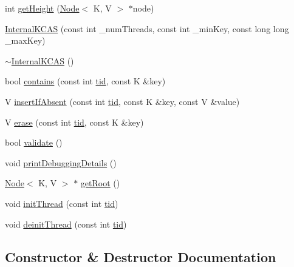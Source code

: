 \begin{DoxyCompactItemize}
\item 
int \hyperlink{classInternalKCAS_ad72d4be132cc659a5c992321277cf193}{get\+Height} (\hyperlink{classNode}{Node}$<$ K, V $>$ $\ast$node)
\item 
\hyperlink{classInternalKCAS_ac9c322cd3a85b979a08de155c21f67e1}{Internal\+K\+C\+AS} (const int \+\_\+num\+Threads, const int \+\_\+min\+Key, const long long \+\_\+max\+Key)
\item 
\hyperlink{classInternalKCAS_abd61df2bf061536a6565252d31d3f3f3}{$\sim$\+Internal\+K\+C\+AS} ()
\item 
bool \hyperlink{classInternalKCAS_a6cc67a7c0c48dcb3dfc92caf1661caff}{contains} (const int \hyperlink{microbench_2main_8cpp_a9ca9869868fe7e7a38a921cc7de4103f}{tid}, const K \&key)
\item 
V \hyperlink{classInternalKCAS_ab3010217722850563fca996779d44aaf}{insert\+If\+Absent} (const int \hyperlink{microbench_2main_8cpp_a9ca9869868fe7e7a38a921cc7de4103f}{tid}, const K \&key, const V \&value)
\item 
V \hyperlink{classInternalKCAS_a13be8756f4bed1d759d5018aa0d2d380}{erase} (const int \hyperlink{microbench_2main_8cpp_a9ca9869868fe7e7a38a921cc7de4103f}{tid}, const K \&key)
\item 
bool \hyperlink{classInternalKCAS_abbe352f377d39453950e11caf7c5081d}{validate} ()
\item 
void \hyperlink{classInternalKCAS_a03139bf48fad9708cf170f246696870a}{print\+Debugging\+Details} ()
\item 
\hyperlink{classNode}{Node}$<$ K, V $>$ $\ast$ \hyperlink{classInternalKCAS_a4b6e760af14cd473618fcc12baf18d6d}{get\+Root} ()
\item 
void \hyperlink{classInternalKCAS_ab4fe3ffb3c0839a75a9a4272750d10e4}{init\+Thread} (const int \hyperlink{microbench_2main_8cpp_a9ca9869868fe7e7a38a921cc7de4103f}{tid})
\item 
void \hyperlink{classInternalKCAS_a34b83ecf38951b339abc5e1270d97c84}{deinit\+Thread} (const int \hyperlink{microbench_2main_8cpp_a9ca9869868fe7e7a38a921cc7de4103f}{tid})
\end{DoxyCompactItemize}


\subsection{Constructor \& Destructor Documentation}
\mbox{\label{classInternalKCAS_ac9c322cd3a85b979a08de155c21f67e1}} 
